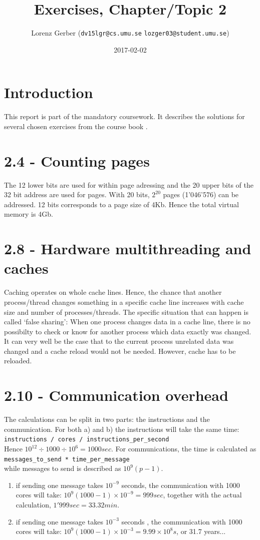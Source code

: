 \documentclass[a4paper,11pt,twoside]{article}
\title{Exercises, Chapter/Topic 2}
\author{Lorenz Gerber ({\tt{dv15lgr@cs.umu.se}} {\tt{lozger03@student.umu.se}})}
\date{2017-02-02}
\begin{document}
\lstset{language=C}
\maketitle
\thispagestyle{empty}
\newpage
\tableofcontents
\thispagestyle{empty}
\newpage

\clearpage
{}

\section{Introduction}
This report is part of the mandatory coursework. It describes the solutions for several chosen exercises from the course book \cite{pacheco2011}.
\section{2.4 - Counting pages}
The 12 lower bits are used for within page adressing and the 20 upper bits of the 32 bit address are used for pages. With 20 bits, $2^{20}$ pages (1'046'576) can be addressed. 12 bits corresponds to a page size of 4Kb. Hence the total virtual memory is 4Gb. 
\section{2.8 - Hardware multithreading and caches}
Caching operates on whole cache lines. Hence, the chance that another process/thread changes something in a specific cache line increases with cache size and number of processes/threads. The specific situation that can happen is called `false sharing': When one process changes data in a cache line, there is no possibilty to check or know for another process which data exactly was changed. It can very well be the case that to the current process unrelated data was changed and a cache reload would not be needed. However, cache has to be reloaded. 
\section{2.10 - Communication overhead}
The calculations can be split in two parts: the instructions and the communication. For both a) and b) the instructions will take the same time:\\
\verb+instructions / cores / instructions_per_second+\\
Hence $10^{12} \div 1000 \div 10^{6} = 1000 sec$. For communications, the time is calculated as\\
\verb+messages_to_send * time_per_message+\\
while messages to send is described as $10^{9}(p-1)$. 
\begin{enumerate}[label={\alph*)}]
\item if sending one message takes $10^{-9}$ seconds, the communication with 1000 cores will take: $10^{9}(1000-1) \times 10^{-9} = 999 sec$, together with the actual calculation, $1'999 sec = 33.32min$.
\item if sending one message takes $10^{-3}$ seconds , the communication with 1000 cores will take: $10^{9}(1000-1) \times 10^{-3} = 9.99\times10^{8} s$, or 31.7 years...
\end{enumerate}
\end{document}
